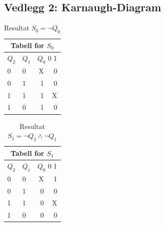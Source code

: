 \documentclass[12pt,norsk,a4paper]{article}
\begin{document}
    \subsection{Vedlegg 2: Karnaugh-Diagram}
    \begin{table}[H]
    \begin{center}
    \begin{tabular}{|l|l|r|r|} \hline
    \multicolumn{4}{|c|}{Tabell for $S_0$} \\ \hline
    $Q_2$ & $Q_1$ & \multicolumn{2}{|r|}{$Q_0$ \hspace{20 mm} 0 \hspace{2 mm} 1} \\ \hline
    0 & 0 & \hspace{27 mm} X \cellcolor[gray]{0.8} & 0 \\ \hline 
    0 & 1 & 1 \cellcolor[gray]{0.8} & 0 \\ \hline
    1 & 1 & 1 \cellcolor[gray]{0.8} & X \\ \hline
    1 & 0 & 1 \cellcolor[gray]{0.8} & 0 \\ \hline
    \end{tabular}
    \end{center}
    \caption{Resultat $S_0=\neg Q_0$}
    \end{table}


    \begin{table}[H]
    \begin{center}
    \begin{tabular}{|l|l|r|r|} \hline
    \multicolumn{4}{|c|}{Tabell for $S_1$} \\ \hline
    $Q_2$ & $Q_1$ & \multicolumn{2}{|r|}{$Q_0$ \hspace{20 mm} 0 \hspace{2 mm} 1} \\ \hline
    0 & 0 & \hspace{27 mm} X \cellcolor[gray]{0.8} & \cellcolor[gray]{0.8} 1 \\ \hline 
    0 & 1 & 0 & 0 \\ \hline
    1 & 1 & 0 & X \\ \hline
    1 & 0 & 0 & 0 \\ \hline
    \end{tabular}
    \end{center}
    \caption{Resultat $S_1=\neg Q_2 \wedge \neg Q_1$}
    \end{table}
\end{document}
